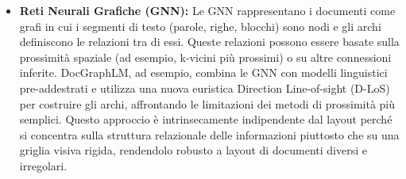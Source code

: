 \documentclass[a4paper, 11pt]{article}
\begin{document}
\begin{itemize}
    \item \textbf{Reti Neurali Grafiche (GNN):} Le GNN rappresentano i documenti come grafi in cui i segmenti di testo (parole, righe, blocchi) sono nodi e gli archi definiscono le relazioni tra di essi. \cite{survey_deep_learning_ocr} Queste relazioni possono essere basate sulla prossimità spaziale (ad esempio, k-vicini più prossimi) o su altre connessioni inferite. DocGraphLM, ad esempio, combina le GNN con modelli linguistici pre-addestrati e utilizza una nuova euristica Direction Line-of-sight (D-LoS) per costruire gli archi, affrontando le limitazioni dei metodi di prossimità più semplici. \cite{docgraphlm_v1} Questo approccio è intrinsecamente indipendente dal layout perché si concentra sulla struttura relazionale delle informazioni piuttosto che su una griglia visiva rigida, rendendolo robusto a layout di documenti diversi e irregolari.
\end{itemize}
\end{document}
